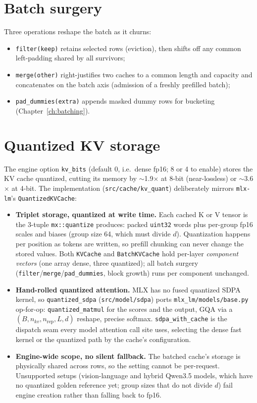 \documentclass[11pt,a4paper]{report}
\newcommand{\code}[1]{\texttt{#1}}
\begin{document}
\section{Batch surgery}
Three operations reshape the batch as it churns:
\begin{itemize}[nosep]
  \item \code{filter(keep)} retains selected rows (eviction), then shifts off
        any common left-padding shared by all survivors;
  \item \code{merge(other)} right-justifies two caches to a common length and
        capacity and concatenates on the batch axis (admission of a freshly
        prefilled batch);
  \item \code{pad\_dummies(extra)} appends masked dummy rows for bucketing
        (Chapter~\ref{ch:batching}).
\end{itemize}

\section{Quantized KV storage}
\label{sec:kvquant}
The engine option \code{kv\_bits} (default 0, i.e.\ dense fp16; 8 or 4 to enable)
stores the KV cache quantized, cutting its memory by $\sim$1.9$\times$ at 8-bit
(near-lossless) or $\sim$3.6$\times$ at 4-bit. The implementation
(\code{src/cache/kv\_quant}) deliberately mirrors \code{mlx-lm}'s
\code{QuantizedKVCache}:

\begin{itemize}[nosep]
  \item \textbf{Triplet storage, quantized at write time.} Each cached K or V
        tensor is the 3-tuple \code{mx::quantize} produces: packed
        \code{uint32} words plus per-group fp16 scales and biases (group size 64,
        which must divide $d$). Quantization happens per position as tokens are
        written, so prefill chunking can never change the stored values. Both
        \code{KVCache} and \code{BatchKVCache} hold per-layer \emph{component
        vectors} (one array dense, three quantized); all batch surgery
        (\code{filter}/\code{merge}/\code{pad\_dummies}, block growth) runs per
        component unchanged.
  \item \textbf{Hand-rolled quantized attention.} MLX has no fused quantized SDPA
        kernel, so \code{quantized\_sdpa} (\code{src/model/sdpa}) ports
        \code{mlx\_lm/models/base.py} op-for-op: \code{quantized\_matmul} for the
        scores and the output, GQA via a $(B, n_{kv}, n_{\text{rep}}, L, d)$
        reshape, precise softmax. \code{sdpa\_with\_cache} is the dispatch seam
        every model attention call site uses, selecting the dense fast kernel or
        the quantized path by the cache's configuration.
  \item \textbf{Engine-wide scope, no silent fallback.} The batched cache's
        storage is physically shared across rows, so the setting cannot be
        per-request. Unsupported setups (vision-language and hybrid Qwen3.5
        models, which have no quantized golden reference yet; group sizes that do
        not divide $d$) fail engine creation rather than falling back to fp16.
\end{itemize}
\end{document}
